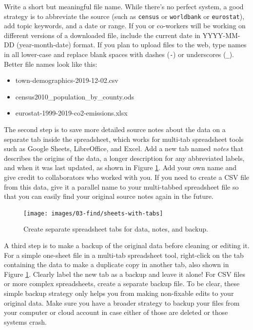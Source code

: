 \documentclass[
  english,
]{book}
\providecommand{\tightlist}{%
  \setlength{\itemsep}{0pt}\setlength{\parskip}{0pt}}
\begin{document}
Write a short but meaningful file name. While there's no perfect system, a good strategy is to abbreviate the source (such as \texttt{census} or \texttt{worldbank} or \texttt{eurostat}), add topic keywords, and a date or range. If you or co-workers will be working on different versions of a downloaded file, include the current date in YYYY-MM-DD (year-month-date) format. If you plan to upload files to the web, type names in all lower-case and replace blank spaces with dashes (\texttt{-}) or underscores (\texttt{\_}). Better file names look like this:

\begin{itemize}
\tightlist
\item
  town-demographics-2019-12-02.csv
\item
  census2010\_population\_by\_county.ods
\item
  eurostat-1999-2019-co2-emissions.xlsx
\end{itemize}

The second step is to save more detailed source notes about the data on a separate tab inside the spreadsheet, which works for multi-tab spreadsheet tools such as Google Sheets, LibreOffice, and Excel. Add a new tab named \emph{notes} that describes the origins of the data, a longer description for any abbreviated labels, and when it was last updated, as shown in Figure \ref{fig:sheets-with-tabs}. Add your own name and give credit to collaborators who worked with you. If you need to create a CSV file from this data, give it a parallel name to your multi-tabbed spreadsheet file so that you can easily find your original source notes again in the future.



\begin{figure}
\texttt{[image: images/03-find/sheets-with-tabs]} \caption{Create separate spreadsheet tabs for data, notes, and backup.}\label{fig:sheets-with-tabs}
\end{figure}

A third step is to make a backup of the original data before cleaning or editing it. For a simple one-sheet file in a multi-tab spreadsheet tool, right-click on the tab containing the data to make a duplicate copy in another tab, also shown in Figure \ref{fig:sheets-with-tabs}. Clearly label the new tab as a backup and leave it alone! For CSV files or more complex spreadsheets, create a separate backup file. To be clear, these simple backup strategy only helps you from making non-fixable edits to your original data. Make sure you have a broader strategy to backup your files from your computer or cloud account in case either of those are deleted or those systems crash.
\end{document}
